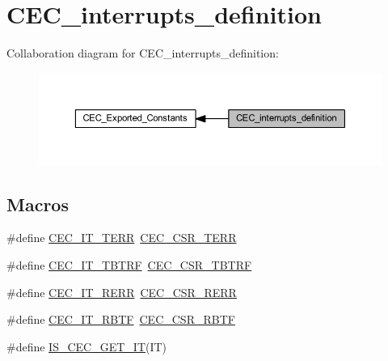 \hypertarget{group___c_e_c__interrupts__definition}{}\section{C\+E\+C\+\_\+interrupts\+\_\+definition}
\label{group___c_e_c__interrupts__definition}
Collaboration diagram for C\+E\+C\+\_\+interrupts\+\_\+definition\+:
\nopagebreak
\begin{figure}[H]
\begin{center}
\leavevmode
\includegraphics[width=350pt]{group___c_e_c__interrupts__definition}
\end{center}
\end{figure}
\subsection*{Macros}
\begin{DoxyCompactItemize}
\item 
\#define \hyperlink{group___c_e_c__interrupts__definition_ga25f97d245f29e04a2d2bbc840389e6b5}{C\+E\+C\+\_\+\+I\+T\+\_\+\+T\+E\+RR}~\hyperlink{group___peripheral___registers___bits___definition_ga273caacb035cb2ec64c721fa6c747c35}{C\+E\+C\+\_\+\+C\+S\+R\+\_\+\+T\+E\+RR}
\item 
\#define \hyperlink{group___c_e_c__interrupts__definition_ga12b00fb3989f9ce9f2f7fc0094c0747d}{C\+E\+C\+\_\+\+I\+T\+\_\+\+T\+B\+T\+RF}~\hyperlink{group___peripheral___registers___bits___definition_ga650bba50140fa01d98abe80bf004a9b6}{C\+E\+C\+\_\+\+C\+S\+R\+\_\+\+T\+B\+T\+RF}
\item 
\#define \hyperlink{group___c_e_c__interrupts__definition_gac015ebba728a69eeb84be1bc56a58ac0}{C\+E\+C\+\_\+\+I\+T\+\_\+\+R\+E\+RR}~\hyperlink{group___peripheral___registers___bits___definition_ga2e33f1d4724efa45fce87ae2fcba6cff}{C\+E\+C\+\_\+\+C\+S\+R\+\_\+\+R\+E\+RR}
\item 
\#define \hyperlink{group___c_e_c__interrupts__definition_ga42834131bf077a878e84470ae98f1bb4}{C\+E\+C\+\_\+\+I\+T\+\_\+\+R\+B\+TF}~\hyperlink{group___peripheral___registers___bits___definition_gaa325807f8f3d4bdf8e989eeef208ca5a}{C\+E\+C\+\_\+\+C\+S\+R\+\_\+\+R\+B\+TF}
\item 
\#define \hyperlink{group___c_e_c__interrupts__definition_ga7f553a4a3346c676101d81a024a9cba8}{I\+S\+\_\+\+C\+E\+C\+\_\+\+G\+E\+T\+\_\+\+IT}(IT)
\end{DoxyCompactItemize}


